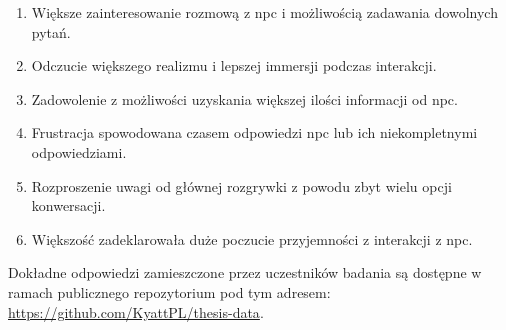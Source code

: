 \begin{enumerate}
    \item Większe zainteresowanie rozmową z \gls{npc} i możliwością zadawania dowolnych pytań.
    \item Odczucie większego realizmu i lepszej immersji podczas interakcji.
    \item Zadowolenie z możliwości uzyskania większej ilości informacji od \gls{npc}.
    \item Frustracja spowodowana czasem odpowiedzi \gls{npc} lub ich niekompletnymi odpowiedziami.
    \item Rozproszenie uwagi od głównej rozgrywki z powodu zbyt wielu opcji konwersacji.
    \item Większość zadeklarowała duże poczucie przyjemności z interakcji z \gls{npc}.
\end{enumerate}

Dokładne odpowiedzi zamieszczone przez uczestników badania są dostępne w ramach publicznego
repozytorium pod tym adresem: \href{https://github.com/KyattPL/thesis-data}{https://github.com/KyattPL/thesis-data}.